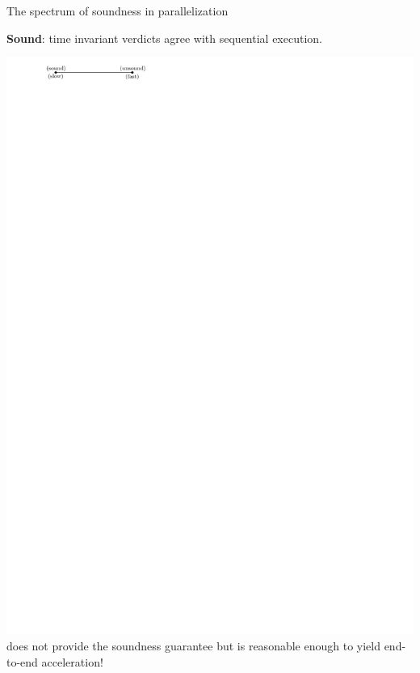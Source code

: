 \documentclass{beamer}
\begin{document}
\begin{frame}{The spectrum of soundness in parallelization}
	
	{\textbf{\rsm Sound}: time invariant verdicts agree with sequential execution.}
	\begin{center}
		\includegraphics[width=0.8\linewidth,page=1]{images/spectrum.pdf}
		\vfill
		{\color{white}\tname{} does not provide the soundness guarantee but is reasonable enough to yield end-to-end acceleration!}
	\end{center}
\end{frame}
\end{document}
